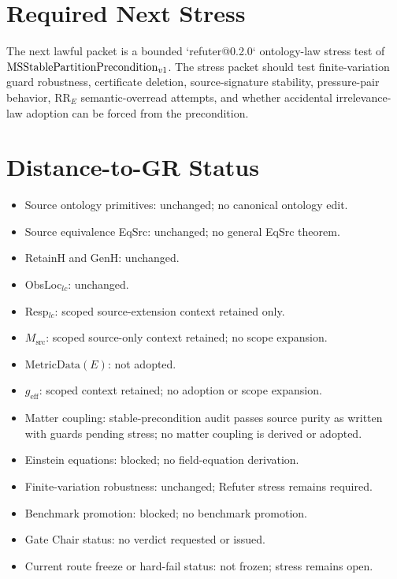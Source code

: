 \section{Required Next Stress}

The next lawful packet is a bounded `refuter@0.2.0` ontology-law stress test
of \(\mathrm{MSStablePartitionPrecondition}_{v1}\). The stress packet should test finite-variation guard
robustness, certificate deletion, source-signature stability, pressure-pair
behavior, \(\mathrm{RR}_E\) semantic-overread attempts, and whether accidental
irrelevance-law adoption can be forced from the precondition.

\section{Distance-to-GR Status}

\begin{itemize}
  \item Source ontology primitives: unchanged; no canonical ontology edit.
  \item Source equivalence EqSrc: unchanged; no general EqSrc theorem.
  \item RetainH and GenH: unchanged.
  \item ObsLoc\(_{lc}\): unchanged.
  \item Resp\(_{lc}\): scoped source-extension context retained only.
  \item \(M_{\mathrm{src}}\): scoped source-only context retained; no scope
    expansion.
  \item \(\mathrm{MetricData}(E)\): not adopted.
  \item \(g_{\mathrm{eff}}\): scoped context retained; no adoption or scope
    expansion.
  \item Matter coupling: stable-precondition audit passes source purity as
    written with guards pending stress; no matter coupling is derived or
    adopted.
  \item Einstein equations: blocked; no field-equation derivation.
  \item Finite-variation robustness: unchanged; Refuter stress remains
    required.
  \item Benchmark promotion: blocked; no benchmark promotion.
  \item Gate Chair status: no verdict requested or issued.
  \item Current route freeze or hard-fail status: not frozen; stress remains
    open.
\end{itemize}

